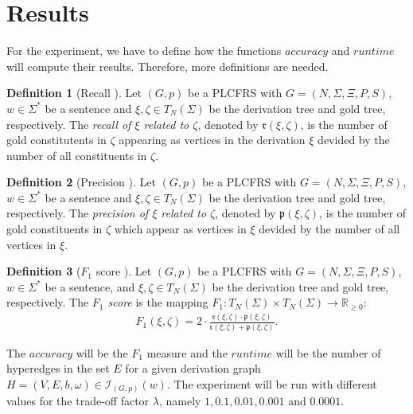 \documentclass{tudscrartcl}
\theoremstyle{definition}
\newtheorem{definition}{Definition}[section]
\begin{document}
\section{Results}

For the experiment, we have to define how the functions $accuracy$ and $runtime$ will compute their results. Therefore, more definitions are needed.
\begin{definition}[Recall \cite{powers11}]
	Let $(G, p)$ be a PLCFRS with $G = (N, \Sigma, \Xi, P, S)$,
	$w \in \Sigma^*$ be a sentence
	and $\xi, \zeta \in T_N(\Sigma)$ be the derivation tree and gold tree, respectively.
	The \emph{recall of $\xi$ related to $\zeta$}, denoted by
	$\mathfrak{r}(\xi, \zeta)$, is the number of gold
	constitutents in $\zeta$ appearing as vertices in the derivation $\xi$ devided by
	the number of all constituents in $\zeta$.
\end{definition}
\begin{definition}[Precision \cite{powers11}]
	Let $(G, p)$ be a PLCFRS with $G = (N, \Sigma, \Xi, P, S)$,
	$w \in \Sigma^*$ be a sentence
	and $\xi, \zeta \in T_N(\Sigma)$ be the derivation tree and gold tree, respectively.
	The \emph{precision of $\xi$ related to $\zeta$}, denoted by
	$\mathfrak{p}(\xi, \zeta)$, is the number of
	gold constituents in $\zeta$ which appear as vertices in $\xi$
	devided by the number of all vertices in $\xi$.
\end{definition}
\begin{definition}[$F_1$ score \cite{powers11}]
	Let $(G, p)$ be a PLCFRS with $G = (N, \Sigma, \Xi, P, S)$,
	$w \in \Sigma^*$ be a sentence,
	and $\xi, \zeta \in T_N(\Sigma)$ be the derivation tree and gold tree, respectively.
	The \emph{$F_1$ score} is the mapping 
	$F_1: T_N(\Sigma) \times T_N(\Sigma) \to \mathbb{R}_{\geq 0}$:
	\begin{align*}
		F_1(\xi, \zeta) =
			2 \cdot \frac{\mathfrak{r}(\xi, \zeta) \cdot \mathfrak{p}(\xi, \zeta)}
			{\mathfrak{r}(\xi, \zeta) + \mathfrak{p}(\xi, \zeta)}.
	\end{align*}
\end{definition}
The $accuracy$ will be the $F_1$ measure and the $runtime$ will be the number of hyperedges in the set $E$ for a given derivation graph $H = (V, E, b, \omega) \in \mathcal{I}_{(G, p)}(w)$.
The experiment will be run with different values for the trade-off factor $\lambda$, namely $1, 0.1, 0.01, 0.001 \text{ and } 0.0001$.
\end{document}
